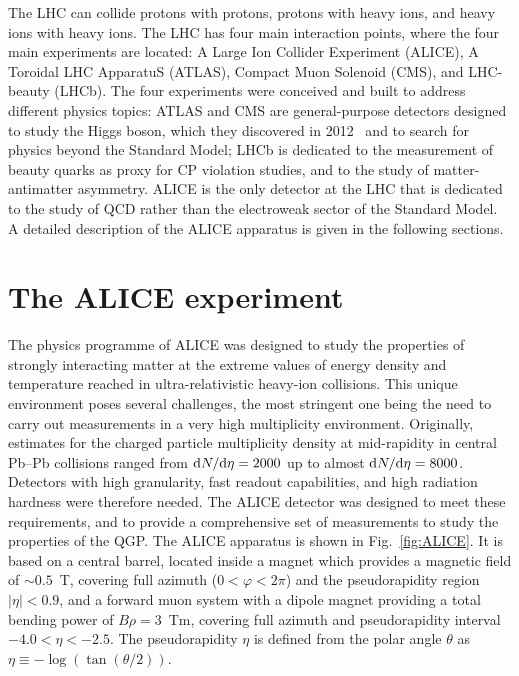 \begin{sloppypar}
The LHC can collide protons with protons, protons with heavy ions, and heavy ions with heavy ions. The LHC has four main interaction points, where the four main experiments are located: A Large Ion Collider Experiment (ALICE), A Toroidal LHC ApparatuS (ATLAS), Compact Muon Solenoid (CMS), and LHC-beauty (LHCb). The four experiments were conceived and built to address different physics topics: ATLAS and CMS are general-purpose detectors designed to study the Higgs boson, which they discovered in 2012~\cite{ATLAS:2012yve,CMS:2012qbp} and to search for physics beyond the Standard Model; LHCb is dedicated to the measurement of beauty quarks as proxy for CP violation studies, and to the study of matter-antimatter asymmetry. ALICE is the only detector at the LHC that is dedicated to the study of QCD rather than the electroweak sector of the Standard Model. A detailed description of the ALICE apparatus is given in the following sections.
\end{sloppypar}

\section{The ALICE experiment}
The physics programme of ALICE was designed to study the properties of strongly interacting matter at the extreme values of energy density and temperature reached in ultra-relativistic heavy-ion collisions. This unique environment poses several challenges, the most stringent one being the need to carry out measurements in a very high multiplicity environment. Originally, estimates for the charged particle multiplicity density at mid-rapidity in central Pb--Pb collisions ranged from $\mathrm{d} N/\mathrm{d}\eta = 2000$ up to almost $\mathrm{d} N/\mathrm{d}\eta = 8000$. Detectors with high granularity, fast readout capabilities, and high radiation hardness were therefore needed. The ALICE detector was designed to meet these requirements, and to provide a comprehensive set of measurements to study the properties of the QGP. The ALICE apparatus is shown in Fig.~\ref{fig:ALICE}. It is based on a central barrel, located inside a magnet which provides a magnetic field of $\sim 0.5$~T, covering full azimuth ($0 < \varphi < 2\pi$) and the pseudorapidity region $\lvert \eta\rvert <0.9$, and a forward muon system with a dipole magnet providing a total bending power of $B\rho = 3$~Tm, covering full azimuth and pseudorapidity interval $-4.0 < \eta < -2.5$. The pseudorapidity $\eta$ is defined from the polar angle $\theta$ as $\eta \equiv -\log(\tan(\theta/2))$. 

